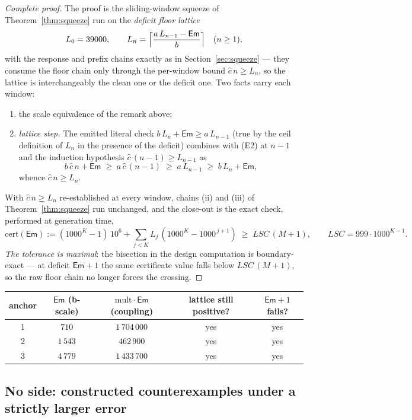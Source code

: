 \documentclass[11pt]{article}
\newcommand{\chat}{\widehat{c}}
\theoremstyle{plain}
\theoremstyle{definition}
\begin{document}
\begin{proof}[Complete proof]
The proof is the sliding-window squeeze of Theorem~\ref{thm:squeeze} run on the
\emph{deficit floor lattice}
\[
L_0=39000,\qquad L_n=\Bigl\lceil\frac{a\,L_{n-1}-\mathsf{Em}}{b}\Bigr\rceil\quad(n\ge 1),
\]
with the response and prefix chains exactly as in Section~\ref{sec:squeeze} --- they
consume the floor chain only through the per-window bound $\chat\,n\ge L_n$, so the lattice
is interchangeably the clean one or the deficit one. Two facts carry each window:
\begin{enumerate}
\item[$\mathrm{(F1)}$] the scale equivalence of the remark above;
\item[$\mathrm{(F2)}$] \emph{lattice step.} The emitted literal check
$b\,L_n+\mathsf{Em}\ge a\,L_{n-1}$ (true by the ceil definition of $L_n$ in the presence
of the deficit) combines with (E2) at $n-1$ and the induction hypothesis
$\chat\,(n-1)\ge L_{n-1}$ as
\[
b\,\chat\,n+\mathsf{Em}\;\ge\;a\,\chat\,(n-1)\;\ge\;a\,L_{n-1}\;\ge\;b\,L_n+\mathsf{Em},
\]
whence $\chat\,n\ge L_n$.
\end{enumerate}
With $\chat\,n\ge L_n$ re-established at every window, chains (ii) and (iii) of
Theorem~\ref{thm:squeeze} run unchanged, and the close-out is the exact check, performed at
generation time,
\[
\mathrm{cert}(\mathsf{Em}):=(1000^{K}-1)\,10^{6}+\sum_{j<K}L_j\,(1000^{K}-1000^{\,j+1})
\;\ge\;LSC\,(M+1),\qquad LSC=999\cdot 1000^{K-1}.
\]
\emph{The tolerance is maximal}: the bisection in the design computation is boundary-exact
--- at deficit $\mathsf{Em}+1$ the same certificate value falls below $LSC\,(M+1)$, so the
raw floor chain no longer forces the crossing.
\end{proof}

\begin{center}
\begin{tabular}{c c c c c}
\hline
\textbf{anchor} & $\mathsf{Em}$ (b-scale) & $\mathrm{mult}\cdot\mathsf{Em}$ (coupling) & lattice still positive? & $\mathsf{Em}+1$ fails?\\
\hline
1 & $710$ & $1\,704\,000$ & yes & yes\\
2 & $1\,543$ & $462\,900$ & yes & yes\\
3 & $4\,779$ & $1\,433\,700$ & yes & yes\\
\hline
\end{tabular}
\end{center}

\subsection{No side: constructed counterexamples under a strictly larger error}
\end{document}

